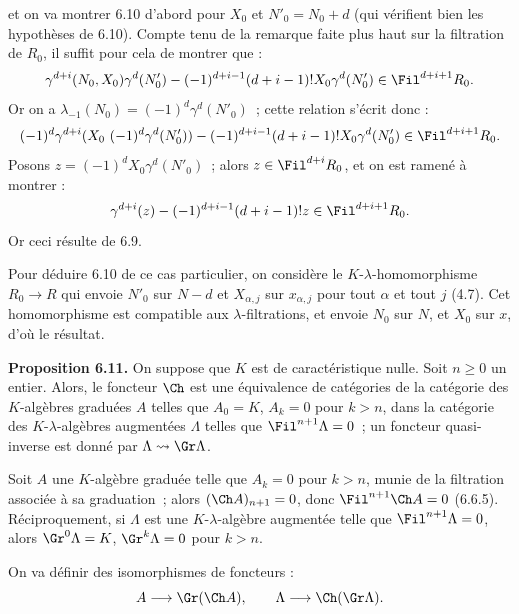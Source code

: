 et on va
montrer 6.10 d'abord pour \(X_0\) et \(N'_0=N_0+d\) (qui vérifient bien les hypothèses de 6.10). Compte tenu de la remarque faite plus haut sur la filtration de \(R_0\), il suffit pour cela de montrer que :
\[
  \gamma^{d+i}(N_0,X_0)\gamma^d(N'_0)
  -
  (-1)^{d+i-1}(d+i-1)!X_0\gamma^d(N'_0)
  \in\Fil^{d+i+1}R_0 .
\]
Or on a \(\lambda_{-1}(N_0)=(-1)^d\gamma^d(N'_0)\)~; cette relation s'écrit donc :
\[
  (-1)^d\gamma^{d+i}(X_0\ (-1)^d\gamma^d(N'_0))
  -
  (-1)^{d+i-1}(d+i-1)!X_0\gamma^d(N'_0)
  \in\Fil^{d+i+1}R_0 .
\]
Posons \(z=(-1)^dX_0\gamma^d(N'_0)\)~; alors \(z\in\Fil^{d+i}R_0\), et on est ramené à montrer :
\[
  \gamma^{d+i}(z)-(-1)^{d+i-1}(d+i-1)!z\in\Fil^{d+i+1}R_0 .
\]
Or ceci résulte de 6.9.

Pour déduire 6.10 de ce cas particulier, on considère le \(K\)-\(\lambda\)-homomorphisme \(R_0\to R\) qui envoie \(N'_0\) sur \(N-d\) et \(X_{\alpha,j}\) sur \(x_{\alpha,j}\) pour tout \(\alpha\) et tout \(j\) (4.7). Cet homomorphisme est compatible aux \(\lambda\)-filtrations, et envoie \(N_0\) sur \(N\), et \(X_0\) sur \(x\), d'où le résultat.

\textbf{Proposition 6.11.} On suppose que \(K\) est de caractéristique nulle. Soit \(n\ge0\) un entier. Alors, le foncteur \(\Ch\) est une équivalence de catégories de la catégorie des \(K\)-algèbres graduées \(A\) telles que \(A_0=K\), \(A_k=0\) pour \(k>n\), dans la catégorie des \(K\)-\(\lambda\)-algèbres augmentées \(\Lambda\) telles que \(\Fil^{n+1}\Lambda=0\)~; un foncteur quasi-inverse est donné par \(\Lambda\rightsquigarrow\Gr\Lambda\).

Soit \(A\) une \(K\)-algèbre graduée telle que \(A_k=0\) pour \(k>n\), munie de la filtration associée à sa graduation~; alors \((\Ch A)_{n+1}=0\), donc \(\Fil^{n+1}\Ch A=0\) (6.6.5). Réciproquement, si \(\Lambda\) est une \(K\)-\(\lambda\)-algèbre augmentée telle que \(\Fil^{n+1}\Lambda=0\), alors \(\Gr^0\Lambda=K\), \(\Gr^k\Lambda=0\) pour \(k>n\).

On va définir des isomorphismes de foncteurs :
\[
  A\longrightarrow \Gr(\Ch A),
  \qquad
  \Lambda\longrightarrow \Ch(\Gr\Lambda).
\]
